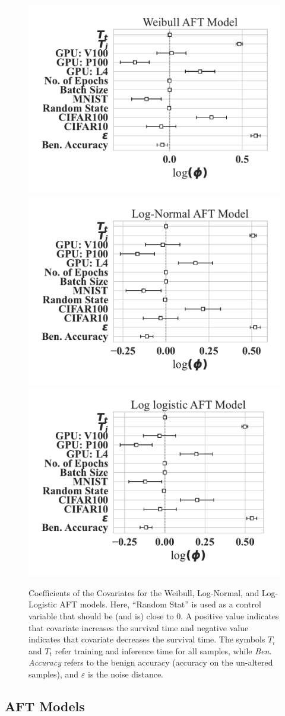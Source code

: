 \documentclass[sn-mathphys-num]{sn-jnl}%
\begin{document}
\begin{figure}[tph!]
    \centering
        \includegraphics[width=.49\textwidth]{plots/combined/weibull_aft.pdf}
        \includegraphics[width=.49\textwidth]{plots/combined/log_normal_aft.pdf}
        \includegraphics[width=.49\textwidth]{plots/combined/log_logistic_aft.pdf}
    \caption{Coefficients of the Covariates for the Weibull, Log-Normal, and Log-Logistic AFT models. Here, ``Random Stat'' is used as a control variable that should be (and is) close to 0. A positive value indicates that covariate increases the survival time and negative value indicates that covariate decreases the survival time. The symbols $T_i$ and $T_t$ refer training and inference time for all samples, while \textit{Ben. Accuracy} refers to the benign accuracy (accuracy on the un-altered samples), and $\varepsilon$ is the noise distance.}
    \label{fig:aft}
\end{figure}
\subsection{AFT Models}
\label{res:aft}
\end{document}

